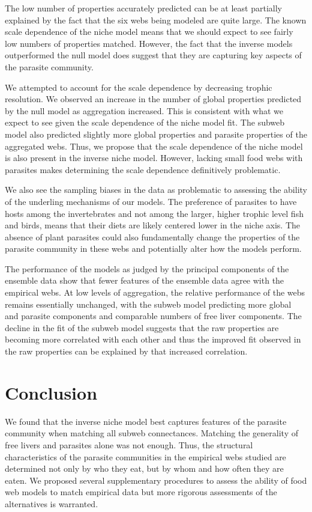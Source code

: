 \documentclass[/home/nkappler/Research/Dissertation/
 dissertation.tex]{subfiles}
\begin{document}
\begin{bibunit}
The low number of properties accurately predicted can be at least partially
explained by the fact that the six webs being modeled are quite large. The
known scale dependence of the niche model means that we should expect to see
fairly low numbers of properties matched. However, the fact that the inverse
models outperformed the null model does suggest that they are capturing key
aspects of the parasite community. 

We attempted to account for the scale dependence by decreasing trophic
resolution. We observed an increase in the number of global properties
predicted by the null model as aggregation increased. This is consistent with
what we expect to see given the scale dependence of the niche model fit. The
subweb model also predicted slightly more global properties and parasite
properties of the aggregated webs. Thus, we propose that the scale dependence
of the niche model is also present in the inverse niche model. However, lacking
small food webs with parasites makes determining the scale dependence
definitively problematic. 

We also see the sampling biases in the data as problematic to assessing the
ability of the underling mechanisms of our models. The preference of parasites
to have hosts among the invertebrates and not among the larger, higher trophic
level fish and birds, means that their diets are likely centered lower in the
niche axis. The absence of plant parasites could also fundamentally change the
properties of the parasite community in these webs and potentially alter how
the models perform.

The performance of the models as judged by the principal components of the
ensemble data show that fewer features of the ensemble data agree with the
empirical webs. At low levels of aggregation, the relative performance of the
webs remains essentially unchanged, with the subweb model predicting more
global and parasite components and comparable numbers of free liver components.
The decline in the fit of the subweb model suggests that the raw properties are
becoming more correlated with each other and thus the improved fit observed in
the raw properties can be explained by that increased correlation.

\section{Conclusion}

We found that the inverse niche model best captures features of the parasite
community when matching all subweb connectances. Matching the generality of
free livers and parasites alone was not enough. Thus, the structural
characteristics of the parasite communities in the empirical webs studied are
determined not only by who they eat, but by whom and how often they are eaten.
We proposed several supplementary procedures to assess the ability of food web
models to match empirical data but more rigorous assessments of the
alternatives is warranted.

\putbib
\end{bibunit}
\end{document}
